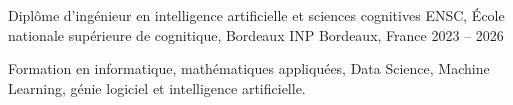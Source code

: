 
\begin{cventries}
  \cventry
    {Diplôme d’ingénieur en intelligence artificielle et sciences cognitives}
    {ENSC, École nationale supérieure de cognitique, Bordeaux INP}
    {Bordeaux, France}
    {2023 -- 2026}
    {
      \begin{cvitems}
        \item {Formation en informatique, mathématiques appliquées, Data Science, Machine Learning, génie logiciel et intelligence artificielle.}
      \end{cvitems}
    }
\end{cventries}
